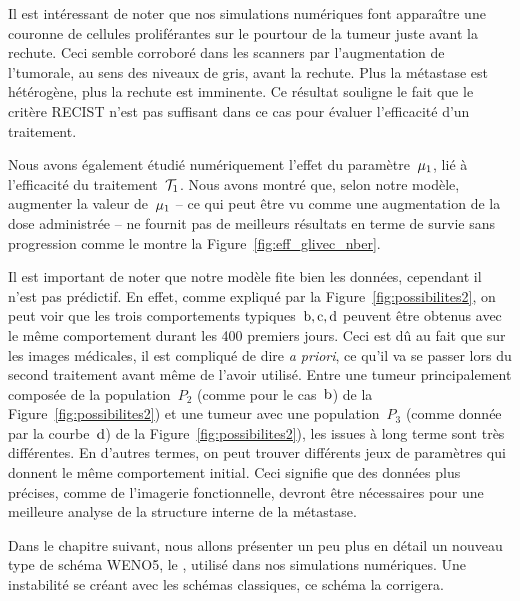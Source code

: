 \documentclass[main.tex]{subfiles}
\begin{document}
Il est intéressant de noter que nos simulations numériques font apparaître une couronne de cellules proliférantes sur le pourtour de la tumeur juste avant la rechute. Ceci semble corroboré dans les scanners par l'augmentation de l'\hetero tumorale, au sens des niveaux de gris, avant la rechute. Plus la métastase est hétérogène, plus la rechute est imminente. Ce résultat souligne le fait que le critère RECIST n'est pas suffisant dans ce cas pour évaluer l'efficacité d'un traitement.


Nous avons également étudié numériquement l'effet du paramètre~$\mu_1$, lié à l'efficacité du traitement~${\mathcal T_1}$. Nous avons montré que, selon notre modèle, augmenter la valeur de~$\mu_1$ -- ce qui peut être vu comme une augmentation de la dose administrée -- ne fournit pas de meilleurs résultats en terme de survie sans progression comme le montre la Figure~\ref{fig:eff_glivec_nber}.


Il est important de noter que notre modèle fite bien les données, cependant il n'est pas prédictif. En effet, comme expliqué par la Figure~\ref{fig:possibilites2}, on peut voir que les trois comportements typiques~$\rm{b,c,d}$ peuvent être obtenus avec le même comportement durant les 400 premiers jours. Ceci est dû au fait que sur les images médicales, il est compliqué de dire {\it a priori}, ce qu'il va se passer lors du second traitement avant même de l'avoir utilisé. 
Entre une tumeur principalement composée de la population~$P_2$ (comme pour le cas~${\rm b}$) de la Figure~\ref{fig:possibilites2}) et une tumeur avec une population~$P_3$ (comme donnée par la courbe~${\rm d}$) de la Figure~\ref{fig:possibilites2}), les issues à long terme sont très différentes. 
En d'autres termes, on peut trouver différents jeux de paramètres qui donnent le même comportement initial. Ceci signifie que des données plus précises, comme de l'imagerie fonctionnelle, devront être nécessaires pour une meilleure analyse de la structure interne de la métastase. 




Dans le chapitre suivant, nous allons présenter un peu plus en détail un nouveau type de schéma WENO5, le \twinweno, utilisé dans nos simulations numériques. Une instabilité se créant avec les schémas classiques, ce schéma la corrigera.
\end{document}
